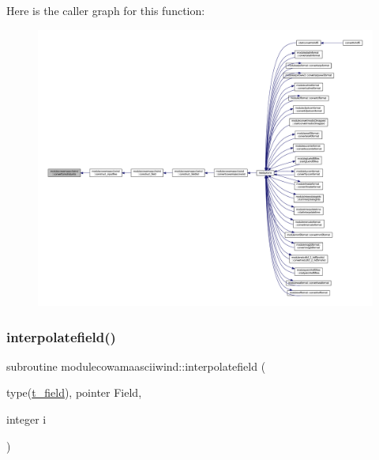 Here is the caller graph for this function\+:\nopagebreak
\begin{figure}[H]
\begin{center}
\leavevmode
\includegraphics[width=350pt]{namespacemodulecowamaasciiwind_abd7579d6017af5f1f691051cd07a84a5_icgraph}
\end{center}
\end{figure}
\mbox{\label{namespacemodulecowamaasciiwind_a3a43fe146a563746fe8d8ed4fb89732c}} 
\subsubsection{\texorpdfstring{interpolatefield()}{interpolatefield()}}
{\footnotesize\ttfamily subroutine modulecowamaasciiwind\+::interpolatefield (\begin{DoxyParamCaption}\item[{type(\mbox{\hyperlink{structmodulecowamaasciiwind_1_1t__field}{t\+\_\+field}}), pointer}]{Field,  }\item[{integer}]{i }\end{DoxyParamCaption})\hspace{0.3cm}{\ttfamily [private]}}


